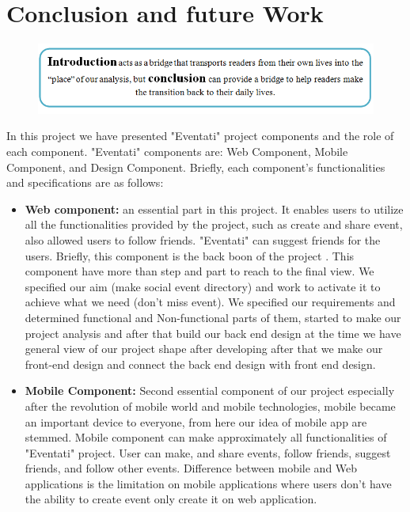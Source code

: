 \documentclass[12pt,a4paper,class,twoside,openany]{report}
\begin{document}
{\chapter{Conclusion and future Work}
\begin{figure}[top]
\begin{center}
\includegraphics[scale=.7]{9-1}
\end{center}
\end{figure}
In this project we have presented "Eventati" project components and the role of each component. "Eventati" components are: Web Component, Mobile Component, and Design Component. Briefly, each component's functionalities and specifications are as follows:
\begin{itemize}
\item 	\textbf{Web component:}
an essential part in this project. It enables users to utilize all the functionalities provided by the project, such as create and share event, also allowed users to follow  friends. "Eventati" can suggest friends for the users.  Briefly, this  component is the back boon of the project  . This component have more than step and part to reach to the final view. We specified our aim (make social event directory) and work to activate it  to  achieve  what we need (don't miss event). We specified our requirements  and determined functional and Non-functional parts of them,  started to make our project analysis and after that  build our back end design at the time we have general view of our project shape after developing after that  we  make our front-end design  and connect the back  end design with front end design.
\item \textbf{Mobile Component:}
Second essential component of our project especially after the revolution of mobile world and mobile technologies, mobile became  an important device  to everyone, from  here  our idea of mobile app are stemmed.  Mobile component can make approximately all functionalities of  "Eventati" project. User can make, and share events, follow friends, suggest friends, and follow other events. Difference between mobile  and Web applications  is the limitation on mobile applications where users don't have the  ability  to create event  only create it on web application. 

\end{itemize}}
\end{document}
